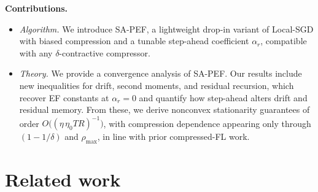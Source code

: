 \documentclass{article} %
\newcommand{\E}{\mathbb{E}}
\begin{document}
\textbf{Contributions.}
\begin{itemize}[leftmargin=*,itemsep=0pt,topsep=0pt,parsep=0pt]
\item \emph{Algorithm.} We introduce SA-PEF, a lightweight drop-in variant of Local-SGD with biased compression and a tunable step-ahead coefficient $\alpha_r$, compatible with any $\delta$-contractive compressor.
\item \emph{Theory.} We provide a convergence analysis of SA-PEF. 
Our results include new inequalities for drift, second moments, and residual recursion, which recover EF constants at $\alpha_r=0$ and quantify how step-ahead alters drift and residual memory. From these, we derive nonconvex stationarity guarantees of order $O\big((\eta\,\eta_0 T R)^{-1}\big)$, with compression dependence appearing only through $(1-1/\delta)$ and $\rho_{\max}$, in line with prior compressed-FL work.
\end{itemize}


\section{Related work}
\end{document}
